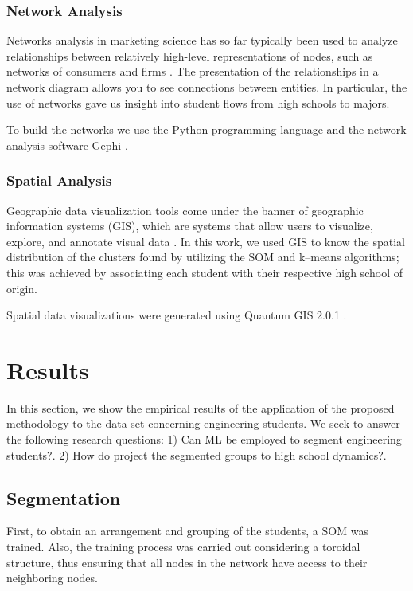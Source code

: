 \documentclass[5p,authoryear,preprint,12pt]{elsarticle}
\begin{document}
\subsubsection{Network Analysis}
Networks analysis in marketing science has so far typically been used to analyze relationships between relatively high-level representations of nodes, such as networks of consumers and firms \citep{kakatkar2019marketing}. The presentation of the relationships in a network diagram allows you to see connections between entities. In particular, the use of networks gave us insight into student flows from high schools to majors.

To build the networks we use the Python programming language and the network analysis software Gephi \citep{bastian2009gephi}.
\subsubsection{Spatial Analysis}
Geographic data visualization tools come under the banner of geographic information systems (GIS), which are systems that allow users to visualize, explore, and annotate visual data \citep{france2019marketing}. In this work, we used GIS to know the spatial distribution of the clusters found by utilizing the SOM and k--means algorithms; this was achieved by associating each student with their respective high school of origin.

Spatial data visualizations were generated using Quantum GIS 2.0.1 \citealp{team2018r}. 
\section{Results}
In this section, we show the empirical results of the application of the proposed methodology to the data set concerning engineering students. We seek to answer the following research questions: 1) Can ML be employed to segment engineering students?. 2) How do project the segmented groups to high school dynamics?.

\subsection{Segmentation}

First, to obtain an arrangement and grouping of the students, a SOM was trained. Also, the training process was carried out considering a toroidal structure, thus ensuring that all nodes in the network have access to their neighboring nodes. 
\end{document}
